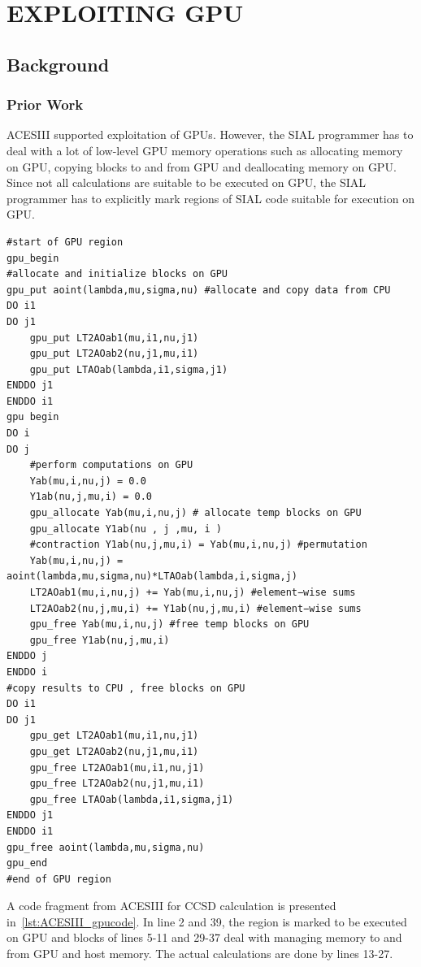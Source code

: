 \chapter{EXPLOITING GPU}\label{exploitinggpu}
\section{Background}
\subsection{Prior Work}
ACESIII supported exploitation of GPUs. However, the SIAL programmer has to deal
with a lot of low-level GPU memory operations such as allocating memory on GPU,
copying blocks to and from GPU and deallocating memory on GPU. Since not all
calculations are suitable to be executed on GPU, the SIAL programmer has to explicitly mark
regions of SIAL code suitable for execution on GPU.

\begin{lstlisting}[caption={Code fragment from ACESIII for CCSD calculation},
  label={lst:ACESIII_gpucode}]
#start of GPU region
gpu_begin
#allocate and initialize blocks on GPU
gpu_put aoint(lambda,mu,sigma,nu) #allocate and copy data from CPU
DO i1
DO j1
    gpu_put LT2AOab1(mu,i1,nu,j1)
    gpu_put LT2AOab2(nu,j1,mu,i1)
    gpu_put LTAOab(lambda,i1,sigma,j1)
ENDDO j1
ENDDO i1
gpu begin
DO i
DO j
    #perform computations on GPU
    Yab(mu,i,nu,j) = 0.0
    Y1ab(nu,j,mu,i) = 0.0
    gpu_allocate Yab(mu,i,nu,j) # allocate temp blocks on GPU
    gpu_allocate Y1ab(nu , j ,mu, i )
    #contraction Y1ab(nu,j,mu,i) = Yab(mu,i,nu,j) #permutation
    Yab(mu,i,nu,j) = aoint(lambda,mu,sigma,nu)*LTAOab(lambda,i,sigma,j)
    LT2AOab1(mu,i,nu,j) += Yab(mu,i,nu,j) #element−wise sums
    LT2AOab2(nu,j,mu,i) += Y1ab(nu,j,mu,i) #element−wise sums
    gpu_free Yab(mu,i,nu,j) #free temp blocks on GPU
    gpu_free Y1ab(nu,j,mu,i)
ENDDO j
ENDDO i
#copy results to CPU , free blocks on GPU
DO i1
DO j1
    gpu_get LT2AOab1(mu,i1,nu,j1)
    gpu_get LT2AOab2(nu,j1,mu,i1)
    gpu_free LT2AOab1(mu,i1,nu,j1)
    gpu_free LT2AOab2(nu,j1,mu,i1)
    gpu_free LTAOab(lambda,i1,sigma,j1)
ENDDO j1
ENDDO i1
gpu_free aoint(lambda,mu,sigma,nu)
gpu_end
#end of GPU region
\end{lstlisting}

A code fragment from ACESIII for CCSD calculation is presented
in~\ref{lst:ACESIII_gpucode}. In line 2 and 39, the region is marked to be executed
on GPU and blocks of lines 5-11 and 29-37 deal with managing memory to and from
GPU and host memory. The actual calculations are done by lines 13-27.

